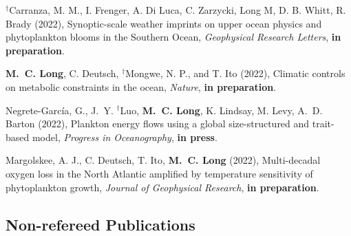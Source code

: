 \documentclass[11pt]{article}
\begin{document}
\begin{thebibliography}{99}

$^\dagger$Carranza,	M. M., I. Frenger,	A. Di Luca,	C. Zarzycki, Long	M, D. B. Whitt, R. Brady (2022),
Synoptic-scale weather imprints on upper ocean physics and phytoplankton blooms	in the Southern	Ocean,
\textit{Geophysical	Research Letters},
\textbf{in preparation}.

\textbf{M.~C. {Long}}, C. Deutsch, $^\dagger$Mongwe, N. P., and T. Ito (2022), Climatic controls on metabolic constraints in the ocean,
\textit{Nature},
\textbf{in preparation}.


Negrete-García, G., J.~Y. $^\dagger$Luo, \textbf{M.~C. {Long}}, K. Lindsay, M. Levy, A.~D. Barton (2022), Plankton energy flows using a global size-structured and trait-based model,
\textit{Progress in Oceanography},
\textbf{in press}.


Margolskee, A. J., C. Deutsch, T. Ito, \textbf{M.~C. {Long}} (2022),
Multi-decadal oxygen loss in the North Atlantic amplified by temperature sensitivity of phytoplankton growth,
\textit{Journal of Geophysical Research},
\textbf{in preparation}.


\end{thebibliography}

\subsection*{Non-refereed Publications}
\end{document}
